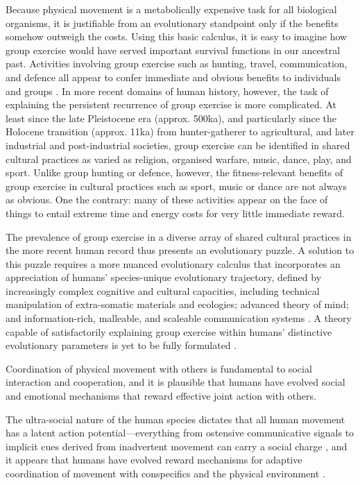 \begin{CJK}{UTF8}{gbsn}
Because physical movement is a metabolically expensive task for all biological organisms, it is justifiable from an evolutionary standpoint only if the benefits somehow outweigh the costs.  Using this basic calculus, it is easy to imagine how group exercise would have served important survival functions in our ancestral past.  Activities involving group exercise such as hunting, travel, communication, and defence all appear to confer immediate and obvious benefits to individuals and groups \citep{Sands2010}.  In more recent domains of human history, however, the task of explaining the persistent recurrence of group exercise is more complicated.  At least since the late Pleistocene era (approx. 500ka), and particularly since the Holocene transition (approx. 11ka) from hunter-gatherer to agricultural, and later industrial and post-industrial societies, group exercise can be identified in shared cultural practices as varied as religion, organised warfare, music, dance, play, and sport.  Unlike group hunting or defence, however, the fitness-relevant benefits of group exercise in cultural practices such as sport, music or dance are not always as obvious.  One the contrary: many of these activities appear on the face of things to entail extreme time and energy costs for very little immediate reward.

The prevalence of group exercise in a diverse array of shared cultural practices in the more recent human record thus presents an evolutionary puzzle.  A solution to this puzzle requires a more nuanced evolutionary calculus that incorporates an appreciation of humans' species-unique evolutionary trajectory, defined by increasingly complex cognitive and cultural capacities, including technical manipulation of extra-somatic materials and ecologies; advanced theory of mind; and information-rich, malleable, and scaleable communication systems \citep{Fuentes2016}.  A theory capable of satisfactorily explaining group exercise within humans' distinctive evolutionary parameters is yet to be fully formulated \citep{Cohen2017}.

Coordination of physical movement with others is fundamental to social interaction and cooperation, and it is plausible that humans have evolved social and emotional mechanisms that reward effective joint action with others.


The ultra-social nature of the human species dictates that all human movement has a latent action potential---everything from ostensive communicative signals to implicit cues derived from inadvertent movement can carry a social charge \citep{Danchin2004}, and it appears that humans have evolved reward mechanisms for adaptive coordination of movement with conspecifics and the physical environment \citep{Wheatley2012,Parkinson2015,Wheatley2016}.


\end{CJK}
